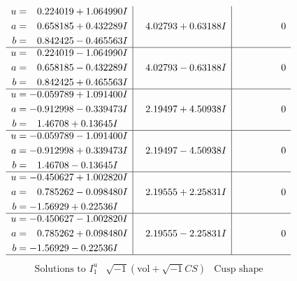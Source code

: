 \documentclass[1p]{elsarticle_modified}
\theoremstyle{definition}
\newcommand{\I}{\sqrt{-1}}
\begin{document}
$$\begin{array}{c|c|c}
\begin{aligned}
u &= \phantom{-}0.224019 + 1.064990 I \\
a &= \phantom{-}0.658185 + 0.432289 I \\
b &= \phantom{-}0.842425 - 0.465563 I\end{aligned}
 & \phantom{-}4.02793 + 0.63188 I & \phantom{-0.000000 } 0 \\ \hline\begin{aligned}
u &= \phantom{-}0.224019 - 1.064990 I \\
a &= \phantom{-}0.658185 - 0.432289 I \\
b &= \phantom{-}0.842425 + 0.465563 I\end{aligned}
 & \phantom{-}4.02793 - 0.63188 I & \phantom{-0.000000 } 0 \\ \hline\begin{aligned}
u &= -0.059789 + 1.091400 I \\
a &= -0.912998 - 0.339473 I \\
b &= \phantom{-}1.46708 + 0.13645 I\end{aligned}
 & \phantom{-}2.19497 + 4.50938 I & \phantom{-0.000000 } 0 \\ \hline\begin{aligned}
u &= -0.059789 - 1.091400 I \\
a &= -0.912998 + 0.339473 I \\
b &= \phantom{-}1.46708 - 0.13645 I\end{aligned}
 & \phantom{-}2.19497 - 4.50938 I & \phantom{-0.000000 } 0 \\ \hline\begin{aligned}
u &= -0.450627 + 1.002820 I \\
a &= \phantom{-}0.785262 - 0.098480 I \\
b &= -1.56929 + 0.22536 I\end{aligned}
 & \phantom{-}2.19555 + 2.25831 I & \phantom{-0.000000 } 0 \\ \hline\begin{aligned}
u &= -0.450627 - 1.002820 I \\
a &= \phantom{-}0.785262 + 0.098480 I \\
b &= -1.56929 - 0.22536 I\end{aligned}
 & \phantom{-}2.19555 - 2.25831 I & \phantom{-0.000000 } 0\\
 \hline 
 \end{array}$$\newpage$$\begin{array}{c|c|c}  
\text{Solutions to }I^u_{1}& \I (\text{vol} + \sqrt{-1}CS) & \text{Cusp shape}\\

\end{array}$$
\end{document}
